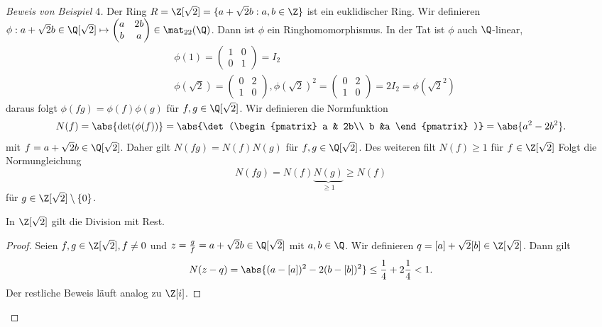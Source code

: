 \begin{proof}[Beweis von Beispiel $4$]
	Der Ring $R = \Z [\sqrt{2}] = \{a + \sqrt{2} b: a,b \in \Z\}$ ist ein euklidischer Ring.
	Wir definieren $\phi: a + \sqrt{2} b \in \Q[\sqrt{2}] \mapsto \begin{pmatrix} 
		a & 2b\\ b & a
	\end{pmatrix} \in \mat_{22}(\Q)$.
	Dann ist $\phi$ ein Ringhomomorphismus.
	In der Tat ist $\phi$ auch $\Q$-linear, 
	\begin{align*}
		&\phi(1) = \begin{pmatrix} 
			1 &0\\ 0 &1
		\end{pmatrix} = I_2\\
		&\phi(\sqrt{2}) = \begin{pmatrix} 
			0 &2\\ 1 &0
		\end{pmatrix}, \phi(\sqrt{2})^2 = \begin{pmatrix} 
			0 &2\\ 1 &0
		\end{pmatrix}  = 2I_2 = \phi(\sqrt{2}^2)
	\end{align*} 
	daraus folgt $\phi(fg) = \phi(f) \phi(g)$ für $f,g \in \Q[\sqrt{2}]$.
	Wir definieren die Normfunktion
	\begin{align*}
		N(f) = \abs{\det(\phi(f))} = \abs{\det(\begin{pmatrix} 
				a & 2b\\ b &a
		\end{pmatrix} )} = \abs{a^2 - 2b^2}
	.\end{align*}
	mit $f = a + \sqrt{2} b \in \Q[\sqrt{2}]$.
	Daher gilt $N(fg) = N(f)N(g)$ für $f,g \in \Q[\sqrt{2}]$.
	Des weiteren filt $N(f) \geq 1$ für $f \in \Z[\sqrt{2}]$ 
	Folgt die Normungleichung 
	\[
		N(fg) = N(f) \underbrace{N(g)}_{\geq 1} \geq N(f)
	\]
	für $g \in \Z[\sqrt{2}] \setminus \{0\} $.
	\begin{lemma}
		In $\Z[\sqrt{2}]$ gilt die Division mit Rest.
	\end{lemma}
	\begin{proof}
		Seien $f,g \in \Z[\sqrt{2}], f \neq 0$ und $z= \frac{g}{f} = a + \sqrt{2} b \in \Q[\sqrt{2}]$ mit $a,b \in \Q$.
		Wir definieren $q = [a] + \sqrt{2} [b] \in \Z[\sqrt{2}]$. Dann gilt
		\begin{align*}
			N(z-q) = \abs{(a-[a])^2 - 2 (b-[b])^2} \leq \frac{1}{4} + 2 \frac{1}{4} < 1
		.\end{align*}
		Der restliche Beweis läuft analog zu $\Z[i]$.
	\end{proof}
\end{proof}

